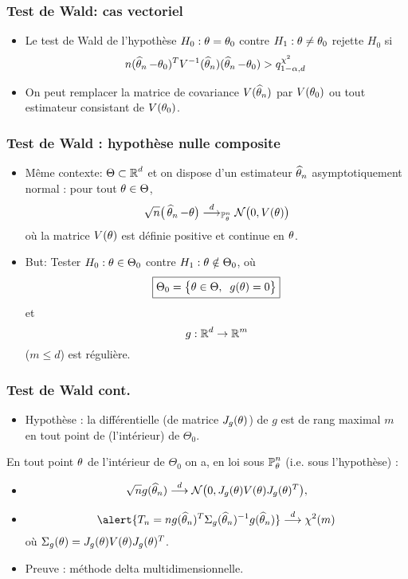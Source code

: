 \begin{frame}
\frametitle{Test de Wald: cas vectoriel}
\begin{itemize}
\item Le test de Wald de l'hypothèse $H_0: \theta= \theta_0$ contre $H_1: \theta \ne \theta_0$
rejette $H_0$ si
\[
n (\operatorname{\widehat \theta_{\mathnormal{n}}} - \theta_0)^T V^{-1}(\operatorname{\widehat \theta_{\mathnormal{n}}}) (\operatorname{\widehat \theta_{\mathnormal{n}}} - \theta_0) > q^{\chi^2}_{1-\alpha,d} \,
\]
\item On peut remplacer la matrice de covariance $V(\operatorname{\widehat \theta_{\mathnormal{n}}})$ par $V(\theta_0)$ ou tout estimateur consistant de $V(\theta_0)$.
\end{itemize}
\end{frame}

\begin{frame}
\frametitle{Test de Wald : hypothèse nulle composite}
\begin{itemize}
\item \alert{ Même contexte:} $\Theta \subset \operatorname{{\mathbb R}}^d$ et \alert{on dispose} d'un
  estimateur $\operatorname{\widehat \theta_{\mathnormal{n}}}$ asymptotiquement normal : pour tout $\theta \in \Theta$,
$$\sqrt{n}\big(\operatorname{\widehat \theta_{\mathnormal{n}}}-\theta\big)\stackrel{d}{\longrightarrow}_{\operatorname{{\mathbb P}}_{\theta}^n} {\mathcal N}\big(0, V(\theta)\big)$$
où la matrice $V(\theta)$ est \alert{définie positive} et continue en $\theta$.
\item \alert{But:} Tester $H_0: \theta \in \Theta_0$ contre $H_1:\theta \notin \Theta_0$, où
$$\boxed{\Theta_0 = \big\{\theta \in \Theta,\;\;g(\theta) = 0\big\}}$$
et
$$g:\operatorname{{\mathbb R}}^d \rightarrow \operatorname{{\mathbb R}}^m$$
($m \leq d$) est régulière.
\end{itemize}
\end{frame}




\begin{frame}
\frametitle{Test de Wald cont.}
\begin{itemize}
\item \alert{Hypothèse : } la différentielle (de matrice $J_g(\theta)$) de $g$ est de rang maximal $m$ en tout point de (l'intérieur) de $\Theta_0$.
\end{itemize}
\begin{prop}
  En tout point $\theta$ de l'intérieur de $\Theta_0$ on a, en loi sous
  $\operatorname{{\mathbb P}}_\theta^n$ (i.e. \alert{sous l'hypothèse}) :
\begin{itemize}
\item $$\sqrt{n}g(\operatorname{\widehat \theta_{\mathnormal{n}}}) \stackrel{d}{\longrightarrow} {\mathcal N}\big(0, J_g(\theta)V(\theta)J_g(\theta)^T\big),$$
\item $$\alert{T_n=ng(\est)^T\Sigma_g(\est)^{-1}g(\est)} \stackrel{d}{\longrightarrow} \chi^2(m)$$
où $\Sigma_g(\theta) =J_g(\theta) V(\theta) J_g(\theta)^T$.
\end{itemize}
\end{prop}
\begin{itemize}
\item Preuve : méthode  delta  multidimensionnelle.
\end{itemize}
\end{frame}

